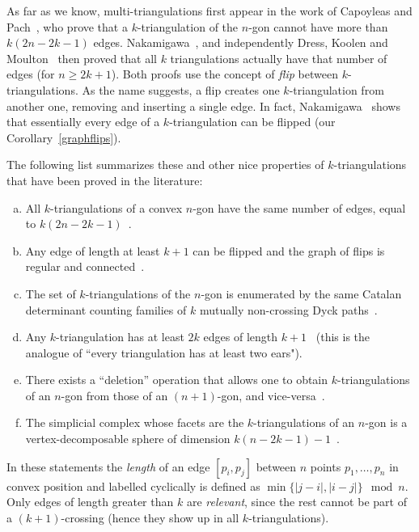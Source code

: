 \documentclass[12pt]{amsart}
\begin{document}
As far as we know, multi-triangulations first appear in the work of Capoyleas and Pach~\cite{cp-tttccp-92}, who prove that a $k$-triangulation of the $n$-gon cannot have more than $k(2n-2k-1)$ edges. 
Nakamigawa~\cite{n-gdfcp-00}, and independently Dress, Koolen and Moulton~\cite{dkm-lahp-02} then proved that all $k$ triangulations actually have that number of edges (for $n\ge 2k+1$). Both proofs use the concept of \emph{flip} between $k$-triangulations. As the name suggests, a flip creates one $k$-triangulation from another one, removing and inserting a single edge.
In fact, Nakamigawa~\cite{n-gdfcp-00} shows that essentially every edge of a $k$-triangulation can be flipped (our Corollary~\ref{graphflips}). 

The following list summarizes these and other nice properties of $k$-triangulations that have been proved in the literature:


\begin{theorem}
\label{thm:intro}
\hfill
\begin{enumerate}[(a)]
\item All $k$-triangulations of a convex $n$-gon have the same number of edges, equal to $k(2n-2k-1)$~\cite{cp-tttccp-92,dkm-lahp-02,n-gdfcp-00}.
\item Any edge of length at least $k+1$ can be flipped and the graph of flips is regular and connected~\cite{dkm-lahp-02,n-gdfcp-00}.
\item The set of $k$-triangulations of the $n$-gon is enumerated by the same Catalan determinant counting families of $k$ mutually non-crossing Dyck paths~\cite{j-gt-03,j-gtdfssp-05}.
\item Any $k$-triangulation has at least $2k$ edges of length $k+1$~\cite{n-gdfcp-00} (this is the analogue of ``every triangulation has at least two ears").
\item There exists a ``deletion'' operation that allows one to obtain $k$-triangulations of an $n$-gon from those of an $(n+1)$-gon, and vice-versa~\cite{j-gt-03,n-gdfcp-00}.
\item The simplicial complex whose facets are the $k$-triangulations of an $n$-gon is a vertex-decomposable sphere of dimension $k(n-2k-1)-1$~\cite{j-gt-03,dgjm-scclahp-08}.
\end{enumerate}
\end{theorem}

In these statements the \emph{length} of an edge $[p_i,p_j]$ between $n$ points $p_1,\dots,p_n$ in convex position and labelled cyclically is defined as $\min\{|j-i|,|i-j|\} \mod n$. Only edges of length greater than $k$ are \emph{relevant}, since the rest cannot be part of a $(k+1)$-crossing (hence they show up in all $k$-triangulations).
\end{document}
